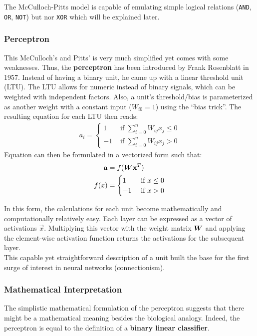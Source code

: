 The McCulloch-Pitts model is capable of emulating simple logical relations (\lstinline|AND|, \lstinline|OR|, \lstinline|NOT|) but nor \lstinline|XOR| which will be explained later.

\subsubsection{Perceptron}
This McCulloch's and Pitts' is very much simplified yet comes with some weaknesses.
Thus, the \textbf{perceptron} has been introduced by Frank Rosenblatt in 1957.
Instead of having a binary unit, he came up with a linear threshold unit (LTU).
The LTU allows for numeric instead of binary signals, which can be weighted with independent factors.
Also, a unit's threshold/bias is parameterized as another weight with a constant input ($W_{i0} = 1$) using the ``bias trick''.
The resulting equation for each LTU then reads:
\begin{align}
    a_i = \begin{cases}
        1 & \text{ if } \sum_{i=0}^n W_{ij} x_j \leq 0 \\
        -1 & \text{ if } \sum_{i=0}^n W_{ij} x_j > 0
    \end{cases}
\end{align}
Equation  can then be formulated in a vectorized form such that:
\begin{align}
    \mathbf{a} & = f(\boldsymbol{W}\mathbf{x}^T) \\
    f(x) & = \begin{cases} 1 & \text{ if } x \leq 0 \\  -1 & \text{ if } x > 0 \end{cases}
\end{align}

In this form, the calculations for each unit become mathematically and computationally relatively easy.
Each layer can be expressed as a vector of activations $\vec{x}$.
Multiplying this vector with the weight matrix $\boldsymbol{W}$ and applying the element-wise activation function returns the activations for the subsequent layer.\\
This capable yet straightforward description of a unit built the base for the first surge of interest in neural networks (connectionism).

\subsubsection{Mathematical Interpretation}
The simplistic mathematical formulation of the perceptron suggests that there might be a mathematical meaning besides the biological analogy.
Indeed, the perceptron is equal to the definition of a \textbf{binary linear classifier}.

